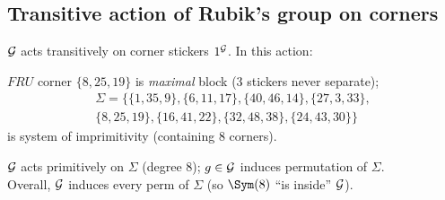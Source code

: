




\subsection{Transitive action of Rubik's group on corners}

\begin{slide}
    $\mathcal{G}$ acts transitively on corner stickers $1^{\mathcal{G}}$. In this action:

    $FRU$ corner $\{8,25,19\}$ is \textit{maximal} block (3 stickers never separate);
    \begin{multline*}
        \Sigma = \{\{1,35,9\},\{6,11,17\},\{40,46,14\},\{27,3,33\},\\
        \{8,25,19\},\{16,41,22\},\{32,48,38\},\{24,43,30\}\}
    \end{multline*}
    is system of imprimitivity (containing 8 corners).

    $\mathcal{G}$ acts primitively on $\Sigma$ (degree 8); $g \in \mathcal{G}$ induces permutation of $\Sigma$.\\
    Overall, $\mathcal{G}$ induces every perm of $\Sigma$ (so $\Sym(8)$ ``is inside'' $\mathcal{G}$).
\end{slide}